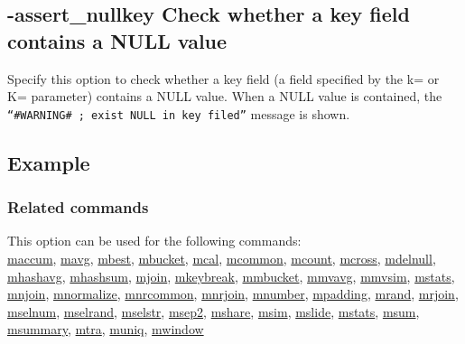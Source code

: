 

%

\subsection{-assert\_nullkey Check whether a key field contains a NULL value \label{sect:option_assert_nullkey}}

Specify this option to check whether a key field (a field specified by the k= or K= parameter) contains a NULL value. When a NULL value is contained, the \verb|“#WARNING# ; exist NULL in key filed”| message is shown.

\subsection*{Example}


\subsubsection*{Related commands}
This option can be used for the following commands: \\
\hyperref[sect:maccum]{maccum},
\hyperref[sect:mavg]{mavg},
\hyperref[sect:mbest]{mbest},
\hyperref[sect:mbucket]{mbucket},
\hyperref[sect:mcal]{mcal},
\hyperref[sect:mcommon]{mcommon},
\hyperref[sect:mcount]{mcount},
\hyperref[sect:mcross]{mcross},
\hyperref[sect:mdelnull]{mdelnull},
\hyperref[sect:mhashavg]{mhashavg},
\hyperref[sect:mhashsum]{mhashsum},
\hyperref[sect:mjoin]{mjoin},
\hyperref[sect:mkeybreak]{mkeybreak},
\hyperref[sect:mmbucket]{mmbucket},
\hyperref[sect:mmvavg]{mmvavg},
\hyperref[sect:mmvsim]{mmvsim},
\hyperref[sect:mstats]{mstats},
\hyperref[sect:mnjoin]{mnjoin},
\hyperref[sect:mnormalize]{mnormalize},
\hyperref[sect:mnrcommon]{mnrcommon},
\hyperref[sect:mnrjoin]{mnrjoin},
\hyperref[sect:mnumber]{mnumber},
\hyperref[sect:mpadding]{mpadding},
\hyperref[sect:mrand]{mrand},
\hyperref[sect:mrjoin]{mrjoin},
\hyperref[sect:mselnum]{mselnum},
\hyperref[sect:mselrand]{mselrand},
\hyperref[sect:mselstr]{mselstr},
\hyperref[sect:msep2]{msep2},
\hyperref[sect:mshare]{mshare},
\hyperref[sect:msim]{msim},
\hyperref[sect:mslide]{mslide},
\hyperref[sect:mstats]{mstats},
\hyperref[sect:msum]{msum},
\hyperref[sect:msummary]{msummary},
\hyperref[sect:mtra]{mtra},
\hyperref[sect:muniq]{muniq},
\hyperref[sect:mwindow]{mwindow}\\

%


